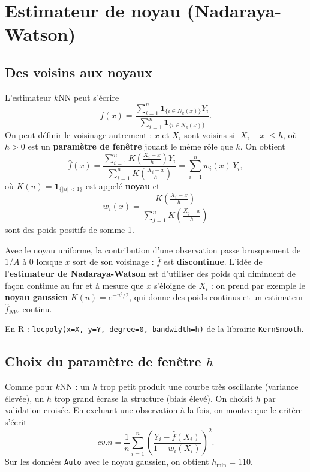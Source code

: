 \documentclass[
  french,
  letterpaper,
  DIV=11,
  numbers=noendperiod]{scrreprt}
\begin{document}
\section{Estimateur de noyau
(Nadaraya-Watson)}\label{estimateur-de-noyau-nadaraya-watson}

\subsection{Des voisins aux noyaux}\label{des-voisins-aux-noyaux}

L'estimateur \(k\)NN peut s'écrire
\[\hat f(x) = \frac{\sum_{i=1}^n \mathbf{1}_{\{i\in N_k(x)\}}Y_i}{\sum_{i=1}^n \mathbf{1}_{\{i\in N_k(x)\}}}.\]
On peut définir le voisinage autrement : \(x\) et \(X_i\) sont voisins
si \(|X_i - x| \leq h\), où \(h > 0\) est un \textbf{paramètre de
fenêtre} jouant le même rôle que \(k\). On obtient
\[\hat f(x) = \frac{\sum_{i=1}^n K\!\left(\frac{X_i - x}{h}\right)Y_i}{\sum_{i=1}^n K\!\left(\frac{X_i - x}{h}\right)} = \sum_{i=1}^n w_i(x)\,Y_i,\]
où \(K(u) = \mathbf{1}_{\{|u|<1\}}\) est appelé \textbf{noyau} et
\[w_i(x) = \frac{K\!\left(\frac{X_i - x}{h}\right)}{\sum_{j=1}^n K\!\left(\frac{X_j - x}{h}\right)}\]
sont des poids positifs de somme 1.

Avec le noyau uniforme, la contribution d'une observation passe
brusquement de \(1/A\) à 0 lorsque \(x\) sort de son voisinage :
\(\hat f\) est \textbf{discontinue}. L'idée de l'\textbf{estimateur de
Nadaraya-Watson} est d'utiliser des poids qui diminuent de façon
continue au fur et à mesure que \(x\) s'éloigne de \(X_i\) : on prend
par exemple le \textbf{noyau gaussien} \(K(u) = e^{-u^2/2}\), qui donne
des poids continus et un estimateur \(\hat f_{NW}\) continu.

En R : \texttt{locpoly(x=X,\ y=Y,\ degree=0,\ bandwidth=h)} de la
librairie \texttt{KernSmooth}.

\subsection{\texorpdfstring{Choix du paramètre de fenêtre
\(h\)}{Choix du paramètre de fenêtre h}}\label{choix-du-paramuxe8tre-de-fenuxeatre-h}

Comme pour \(k\)NN : un \(h\) trop petit produit une courbe très
oscillante (variance élevée), un \(h\) trop grand écrase la structure
(biais élevé). On choisit \(h\) par validation croisée. En excluant une
observation à la fois, on montre que le critère s'écrit
\[cv.n = \frac{1}{n}\sum_{i=1}^n\left(\frac{Y_i - \hat f(X_i)}{1 - w_i(X_i)}\right)^2.\]
Sur les données \texttt{Auto} avec le noyau gaussien, on obtient
\(h_{\min} = 110\).
\end{document}
